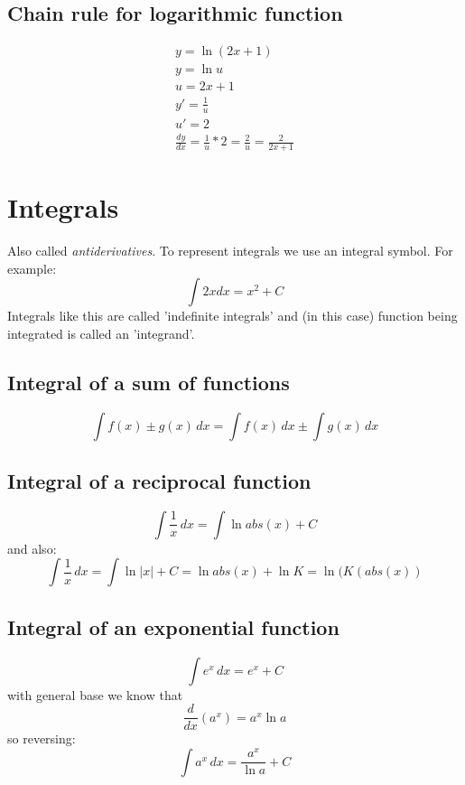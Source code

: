 \documentclass{article}
\begin{document}
\subsection{Chain rule for logarithmic function}
\begin{equation}
  \begin{gathered}
    y = \ln(2x+1) \\
    y = \ln u \\
    u = 2x+1 \\
    y' = \frac{1}{u} \\
    u' = 2 \\
    \frac{dy}{dx} = \frac{1}{u} * 2 = \frac{2}{u} = \frac{2}{2x+1}
  \end{gathered}
\end{equation}

\section{Integrals}
Also called \textit{antiderivatives}. To represent integrals we use an integral
symbol. For example:
\begin{equation}
  \int 2x dx = x^2 + C
\end{equation}
Integrals like this are called 'indefinite integrals' and (in this case)
function being integrated is called an 'integrand'.

\subsection{Integral of a sum of functions}
\begin{equation}
  \int f(x) \pm g(x) \, dx = \int f(x) \, dx \pm \int g(x) \, dx
\end{equation}

\subsection{Integral of a reciprocal function}
\begin{equation}
  \int \frac{1}{x} \, dx = \int \ln abs(x) + C
\end{equation}
and also:
\begin{equation}
  \int \frac{1}{x} \, dx = \int \ln|x| + C = \ln abs(x) + \ln K = \ln (K (abs(x))
\end{equation}

\subsection{Integral of an exponential function}
\begin{equation}
  \int e^x \, dx = e^x + C
\end{equation}
with general base we know that
\begin{equation}
  \frac{d}{dx} (a^x) = a^x \ln a
\end{equation}
so reversing:
\begin{equation}
  \int a^x \, dx = \frac{a^x}{\ln a} + C
\end{equation}
\end{document}
